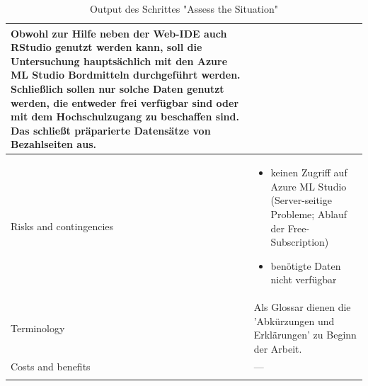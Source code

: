\begin{centering}
\begin{longtable}[H]{|p{3cm}|p{13cm}|}
Obwohl zur Hilfe neben der Web-IDE auch RStudio genutzt werden kann, soll die Untersuchung hauptsächlich mit den Azure ML Studio Bordmitteln durchgeführt werden. \newline
Schließlich sollen nur solche Daten genutzt werden, die entweder frei verfügbar sind oder mit dem Hochschulzugang zu beschaffen sind. Das schließt präparierte Datensätze von Bezahlseiten aus.\\
\hline
Risks and contingencies & \begin{itemize}
\item keinen Zugriff auf Azure ML Studio (Server-seitige Probleme; Ablauf der Free-Subscription)
\item benötigte Daten nicht verfügbar
\end{itemize} \\
\hline
Terminology & Als Glossar dienen die 'Abkürzungen und Erklärungen' zu Beginn der Arbeit. \\
\hline
Costs and benefits & --- \\
\hline
\caption{Output des Schrittes "Assess the Situation"}
\end{longtable} \end{centering}


